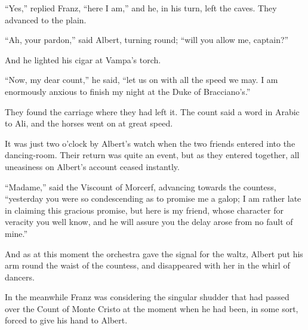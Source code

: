 “Yes,” replied Franz, “here I am,” and he, in his turn, left the caves.
They advanced to the plain.

“Ah, your pardon,” said Albert, turning round; “will you allow me,
captain?”

And he lighted his cigar at Vampa’s torch.

“Now, my dear count,” he said, “let us on with all the speed we may. I
am enormously anxious to finish my night at the Duke of Bracciano’s.”

They found the carriage where they had left it. The count said a word
in Arabic to Ali, and the horses went on at great speed.

It was just two o’clock by Albert’s watch when the two friends entered
into the dancing-room. Their return was quite an event, but as they
entered together, all uneasiness on Albert’s account ceased instantly.

“Madame,” said the Viscount of Morcerf, advancing towards the countess,
“yesterday you were so condescending as to promise me a galop; I am
rather late in claiming this gracious promise, but here is my friend,
whose character for veracity you well know, and he will assure you the
delay arose from no fault of mine.”

And as at this moment the orchestra gave the signal for the waltz,
Albert put his arm round the waist of the countess, and disappeared
with her in the whirl of dancers.

In the meanwhile Franz was considering the singular shudder that had
passed over the Count of Monte Cristo at the moment when he had been,
in some sort, forced to give his hand to Albert.
